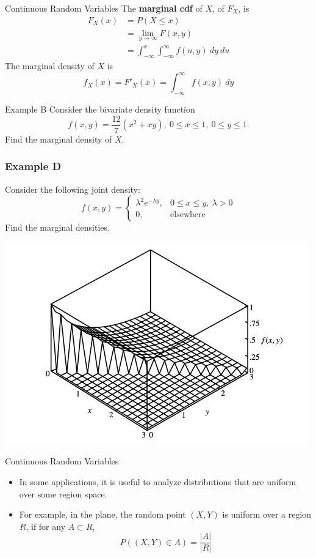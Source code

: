 \documentclass{beamer}
\begin{document}
\begin{frame}{Continuous Random Variables}
    The \textbf{marginal cdf} of \(X\), of \(F_X\), is \begin{align*}
        F_X(x) & = P(X \leq x)\\
        & = \lim_{y \to \infty}F(x,y)\\
        & = \int_{-\infty}^{x} \int_{-\infty}^{\infty} f(u,y)~dy~du
    \end{align*}
    The marginal density of \(X\) is \[f_X(x)=F'_X(x)= \int_{-\infty}^{\infty}f(x,y)~dy\]
\end{frame}


\begin{frame}{Example B}
    Consider the bivariate density function \[f(x,y)=\dfrac{12}{7}(x^2+xy),~0 \leq x \leq 1,~0\leq y \leq 1.\] Find the marginal density of \(X\). 


\end{frame}

\begin{frame}
    \frametitle{Example D}

    Consider the following joint density:
    \[f(x,y)= \begin{cases}
        \lambda^2 e^{-\lambda y}, & 0 \leq x \leq y, ~\lambda >0\\
        0, & \text{elsewhere}
    \end{cases}\] Find the marginal densities. 
    
    \includegraphics[scale=0.5]{Figures/fig_8.png}

\end{frame}

\begin{frame}{Continuous Random Variables}
    \begin{itemize}
        \item In some applications, it is useful to analyze distributions that are uniform over some region space. 
        \item For example, in the plane, the random point \((X,Y)\) is uniform over a region \(R\), if for any \(A \subset R\), \[P((X,Y) \in A)=\dfrac{|A|}{|R|}\]
    \end{itemize}    
\end{frame}
\end{document}
